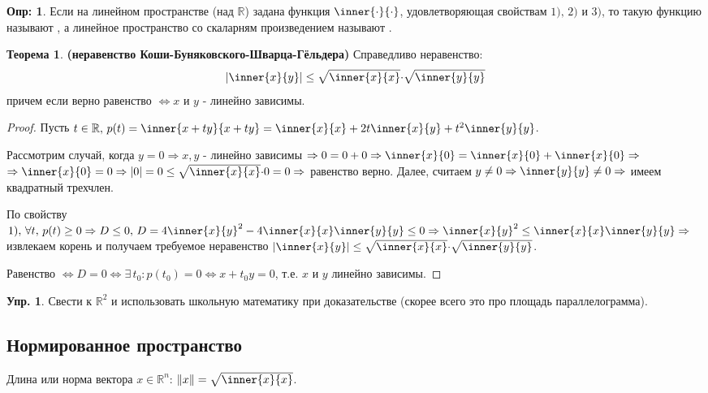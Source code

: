 \documentclass[12pt]{article}
\newcommand{\MR}{\mathbb{R}}
\theoremstyle{definition}
\newtheorem{defn}{Опр:}
\newtheorem{exrc}{Упр.}
\newtheorem{theorem}{Теорема}
\begin{document}
\begin{defn}
	Если на линейном пространстве (над $\MR$) задана функция $\inner{\cdot}{\cdot}$, удовлетворяющая свойствам $1),\, 2)$ и $3)$, то такую функцию называют , а линейное пространство со скаларням произведением называют .
\end{defn}

\begin{theorem}\textbf{(неравенство Коши-Буняковского-Шварца-Гёльдера)} Справедливо неравенство:
		$$|\inner{x}{y}| \leq \sqrt{\inner{x}{x}}{\cdot}\sqrt{\inner{y}{y}}$$
	причем если верно равенство $\Leftrightarrow x$ и $y$ - линейно зависимы.
\end{theorem}
\begin{proof}
	Пусть $t \in \MR, \, p(t) = \inner{x+ty}{x+ty} = \inner{x}{x} + 2t\inner{x}{y} + t^2\inner{y}{y}$. 
	
	Рассмотрим случай, когда $y = 0 \Rightarrow x,y$ - линейно зависимы $\Rightarrow 0 = 0 + 0 \Rightarrow \inner{x}{0} = \inner{x}{0} + \inner{x}{0} \Rightarrow$ \\
	$\Rightarrow \inner{x}{0} = 0 \Rightarrow |0| = 0 \leq \sqrt{\inner{x}{x}}{\cdot}0 = 0 \Rightarrow$ равенство верно. Далее, считаем $y \neq 0 \Rightarrow \inner{y}{y} \neq 0 \Rightarrow$ имеем квадратный трехчлен.
	
	По свойству $1), \, \forall t, \, p(t) \geq 0 \Rightarrow D \leq 0, \, D = 4\inner{x}{y}^2 - 4\inner{x}{x}\inner{y}{y} \leq 0 \Rightarrow \inner{x}{y}^2 \leq \inner{x}{x}\inner{y}{y} \Rightarrow$ извлекаем корень и получаем требуемое неравенство $|\inner{x}{y}| \leq \sqrt{\inner{x}{x}}{\cdot}\sqrt{\inner{y}{y}}$.
	
	Равенство $\Leftrightarrow D = 0 \Leftrightarrow \exists \, t_0\colon p(t_0) = 0 \Leftrightarrow x + t_0y = 0$, т.е. $x$ и $y$ линейно зависимы.
\end{proof}
\begin{exrc}
	Свести к $\MR^2$ и использовать школьную математику при доказательстве (скорее всего это про площадь параллелограмма). 
\end{exrc}

\subsection*{Нормированное пространство}
Длина или норма вектора $x \in \MR^n$: $\|x\| = \sqrt{\inner{x}{x}}$.
\end{document}
